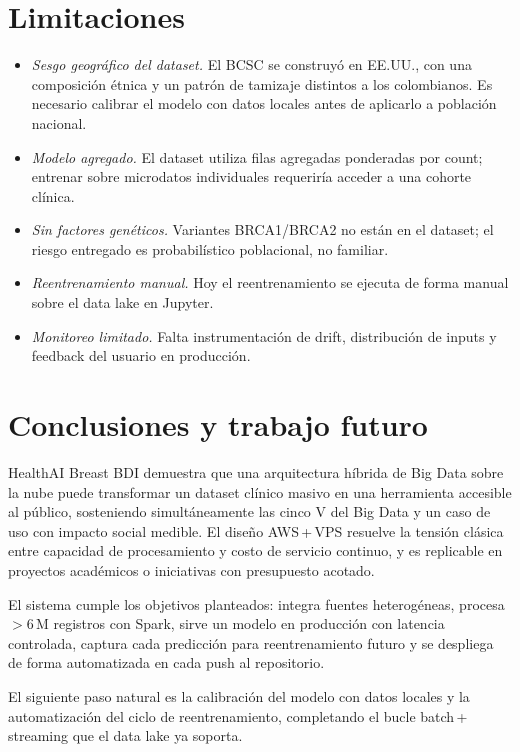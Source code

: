 \documentclass[conference,a4paper,10pt]{IEEEtran}
\newcommand{\code}[1]{{\ttfamily\small\textcolor{hai-primary-dark}{#1}}}
\begin{document}
\section{Limitaciones}\label{sec:lim}
\begin{itemize}[leftmargin=*,nosep]
  \item \emph{Sesgo geográfico del dataset.} El BCSC se construyó en EE.UU., con una composición étnica y un patrón de tamizaje distintos a los colombianos. Es necesario calibrar el modelo con datos locales antes de aplicarlo a población nacional.
  \item \emph{Modelo agregado.} El dataset utiliza filas agregadas ponderadas por \code{count}; entrenar sobre microdatos individuales requeriría acceder a una cohorte clínica.
  \item \emph{Sin factores genéticos.} Variantes BRCA1/BRCA2 no están en el dataset; el riesgo entregado es probabilístico poblacional, no familiar.
  \item \emph{Reentrenamiento manual.} Hoy el reentrenamiento se ejecuta de forma manual sobre el data lake en Jupyter.
  \item \emph{Monitoreo limitado.} Falta instrumentación de drift, distribución de inputs y feedback del usuario en producción.
\end{itemize}

\section{Conclusiones y trabajo futuro}\label{sec:conc}
HealthAI Breast BDI demuestra que una arquitectura híbrida de Big Data
sobre la nube puede transformar un dataset clínico masivo en una
herramienta accesible al público, sosteniendo simultáneamente las cinco
V del Big Data y un caso de uso con impacto social medible. El diseño
AWS\,+\,VPS resuelve la tensión clásica entre capacidad de procesamiento
y costo de servicio continuo, y es replicable en proyectos académicos o
iniciativas con presupuesto acotado.

El sistema cumple los objetivos planteados: integra fuentes
heterogéneas, procesa $>$6\,M registros con Spark, sirve un modelo en
producción con latencia controlada, captura cada predicción para
reentrenamiento futuro y se despliega de forma automatizada en cada
push al repositorio.

El siguiente paso natural es la calibración del modelo con datos
locales y la automatización del ciclo de reentrenamiento, completando
el bucle batch\,+\,streaming que el data lake ya soporta.
\end{document}
